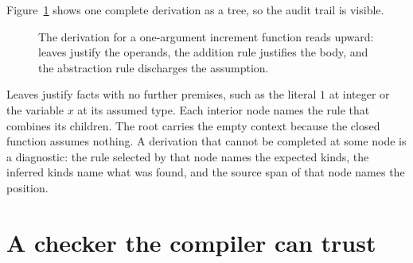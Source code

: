 Figure~\ref{fig:ch39-derivation} shows one complete derivation as a tree, so the audit trail is visible.
\begin{figure}
\centering
{}
\caption{The derivation for a one-argument increment function reads upward: leaves justify the operands, the addition rule justifies the body, and the abstraction rule discharges the assumption.}
\label{fig:ch39-derivation}
\end{figure}
Leaves justify facts with no further premises, such as the literal $1$ at integer or the variable $x$ at its assumed type.
Each interior node names the rule that combines its children.
The root carries the empty context because the closed function assumes nothing.
A derivation that cannot be completed at some node is a diagnostic: the rule selected by that node names the expected kinds, the inferred kinds name what was found, and the source span of that node names the position.

\section{A checker the compiler can trust}
\label{sec:ch39-checker}


